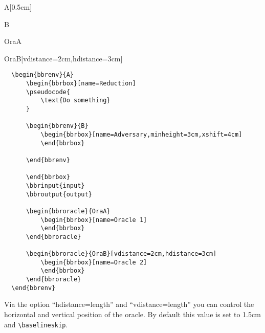 \documentclass[a4paper]{report}
\begin{document}
  \begin{bbrenv}[1cm]{A}[0.5cm]
	  \begin{bbrbox}[name=Reduction]
  
	  \begin{bbrenv}{B}
		  \begin{bbrbox}[name=Adversary,minheight=3cm,xshift=4cm]
		  \end{bbrbox}
  
	  \end{bbrenv}
  
	  \end{bbrbox}
  
	  \begin{bbroracle}{OraA}
		  \begin{bbrbox}[name=Oracle 1]
		  \end{bbrbox}
	  \end{bbroracle}
  
	  \begin{bbroracle}{OraB}[vdistance=2cm,hdistance=3cm]
		  \begin{bbrbox}[name=Oracle 2]
		  \end{bbrbox}
	  \end{bbroracle}
  \end{bbrenv}
  
  
  \begin{lstlisting}
  \begin{bbrenv}{A}
	  \begin{bbrbox}[name=Reduction]
	  \pseudocode{
		  \text{Do something} 
	  }
  
	  \begin{bbrenv}{B}
		  \begin{bbrbox}[name=Adversary,minheight=3cm,xshift=4cm]
		  \end{bbrbox}
  
	  \end{bbrenv}
  
	  \end{bbrbox}
	  \bbrinput{input}
	  \bbroutput{output}
  
	  \begin{bbroracle}{OraA}
		  \begin{bbrbox}[name=Oracle 1]
		  \end{bbrbox}
	  \end{bbroracle}
  
	  \begin{bbroracle}{OraB}[vdistance=2cm,hdistance=3cm]
		  \begin{bbrbox}[name=Oracle 2]
		  \end{bbrbox}
	  \end{bbroracle}
  \end{bbrenv}
  \end{lstlisting}
  Via the option \enquote{hdistance=length} and \enquote{vdistance=length} you can control the horizontal and vertical position of the oracle. By default this value is set to 1.5cm and \lstinline$\baselineskip$.
  
\end{document}
